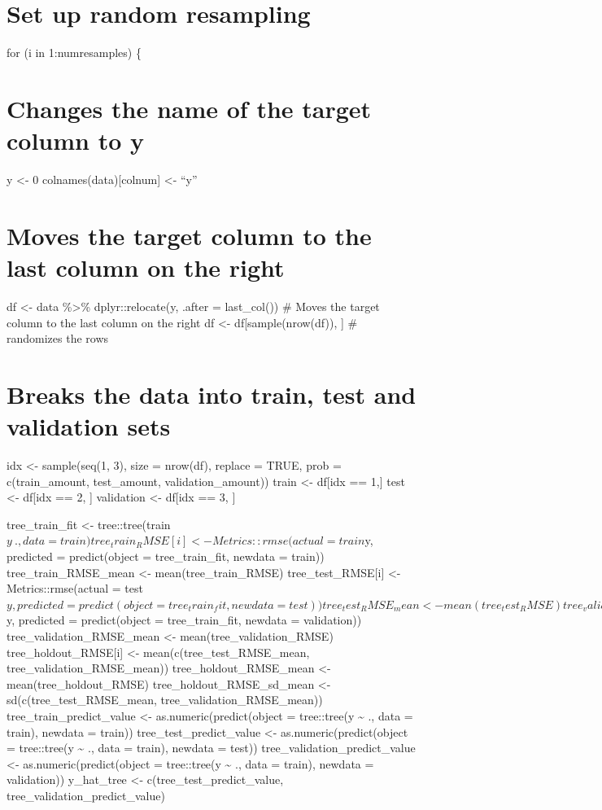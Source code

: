 \documentclass[
]{book}
\begin{document}
\chapter{Set up random resampling}\label{set-up-random-resampling-16}

for (i in 1:numresamples) \{

\chapter{Changes the name of the target column to y}\label{changes-the-name-of-the-target-column-to-y-16}

y \textless- 0 colnames(data){[}colnum{]} \textless- ``y''

\chapter{Moves the target column to the last column on the right}\label{moves-the-target-column-to-the-last-column-on-the-right-16}

df \textless- data \%\textgreater\% dplyr::relocate(y, .after = last\_col()) \# Moves the
target column to the last column on the right df \textless-
df{[}sample(nrow(df)), {]} \# randomizes the rows

\chapter{Breaks the data into train, test and validation sets}\label{breaks-the-data-into-train-test-and-validation-sets-16}

idx \textless- sample(seq(1, 3), size = nrow(df), replace = TRUE, prob =
c(train\_amount, test\_amount, validation\_amount)) train \textless- df{[}idx == 1,{]} test \textless- df{[}idx == 2, {]} validation \textless- df{[}idx == 3, {]}

tree\_train\_fit \textless- tree::tree(train\(y ~ ., data = train)
  tree_train_RMSE[i] <- Metrics::rmse(actual = train\)y, predicted =
predict(object = tree\_train\_fit, newdata = train)) tree\_train\_RMSE\_mean
\textless- mean(tree\_train\_RMSE) tree\_test\_RMSE{[}i{]} \textless- Metrics::rmse(actual =
test\(y, predicted = predict(object = tree_train_fit, newdata = test))
  tree_test_RMSE_mean <- mean(tree_test_RMSE)
  tree_validation_RMSE[i] <- Metrics::rmse(actual = validation\)y,
predicted = predict(object = tree\_train\_fit, newdata = validation))
tree\_validation\_RMSE\_mean \textless- mean(tree\_validation\_RMSE)
tree\_holdout\_RMSE{[}i{]} \textless- mean(c(tree\_test\_RMSE\_mean,
tree\_validation\_RMSE\_mean)) tree\_holdout\_RMSE\_mean \textless-
mean(tree\_holdout\_RMSE) tree\_holdout\_RMSE\_sd\_mean \textless-
sd(c(tree\_test\_RMSE\_mean, tree\_validation\_RMSE\_mean))
tree\_train\_predict\_value \textless- as.numeric(predict(object = tree::tree(y \textasciitilde{}
., data = train), newdata = train)) tree\_test\_predict\_value \textless-
as.numeric(predict(object = tree::tree(y \textasciitilde{} ., data = train), newdata =
test)) tree\_validation\_predict\_value \textless- as.numeric(predict(object =
tree::tree(y \textasciitilde{} ., data = train), newdata = validation)) y\_hat\_tree \textless-
c(tree\_test\_predict\_value, tree\_validation\_predict\_value)
\end{document}
